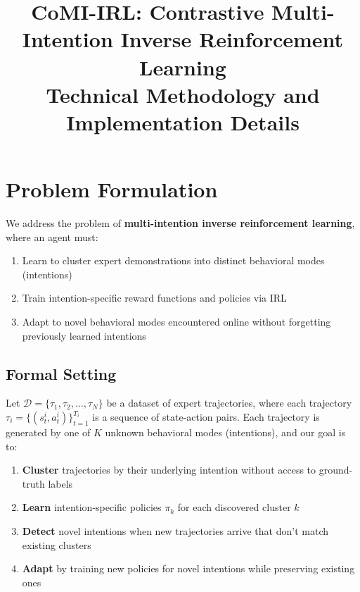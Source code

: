 \documentclass{article}
\title{CoMI-IRL: Contrastive Multi-Intention Inverse Reinforcement Learning\\
\large Technical Methodology and Implementation Details}
\author{}
\date{}
\begin{document}
\maketitle

\tableofcontents
\newpage

\section{Problem Formulation}

We address the problem of \textbf{multi-intention inverse reinforcement learning}, where an agent must:
\begin{enumerate}
    \item Learn to cluster expert demonstrations into distinct behavioral modes (intentions)
    \item Train intention-specific reward functions and policies via IRL
    \item Adapt to novel behavioral modes encountered online without forgetting previously learned intentions
\end{enumerate}

\subsection{Formal Setting}

Let $\mathcal{D} = \{\tau_1, \tau_2, \ldots, \tau_N\}$ be a dataset of expert trajectories, where each trajectory $\tau_i = \{(s_t^i, a_t^i)\}_{t=1}^{T_i}$ is a sequence of state-action pairs. Each trajectory is generated by one of $K$ unknown behavioral modes (intentions), and our goal is to:

\begin{enumerate}
    \item \textbf{Cluster} trajectories by their underlying intention without access to ground-truth labels
    \item \textbf{Learn} intention-specific policies $\pi_k$ for each discovered cluster $k$
    \item \textbf{Detect} novel intentions when new trajectories arrive that don't match existing clusters
    \item \textbf{Adapt} by training new policies for novel intentions while preserving existing ones
\end{enumerate}
\end{document}

